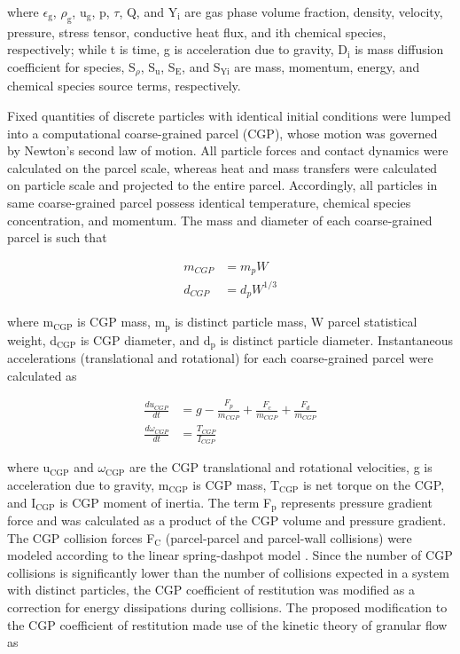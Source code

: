 \noindent where $\epsilon_\text{g}$, $\rho_\text{g}$, u$_\text{g}$, p, $\tau$, Q, and Y$_\text{i}$ are gas phase volume fraction, density, velocity, pressure, stress tensor, conductive heat flux, and ith chemical species, respectively; while t is time, g is acceleration due to gravity, D$_\text{i}$ is mass diffusion coefficient for species, S$_\rho$, S$_\text{u}$, S$_\text{E}$, and S$_\text{Yi}$ are mass, momentum, energy, and chemical species source terms, respectively.

Fixed quantities of discrete particles with identical initial conditions were lumped into a computational coarse-grained parcel (CGP), whose motion was governed by Newton’s second law of motion. All particle forces and contact dynamics were calculated on the parcel scale, whereas heat and mass transfers were calculated on particle scale and projected to the entire parcel. Accordingly, all particles in same coarse-grained parcel possess identical temperature, chemical species concentration, and momentum. The mass and diameter of each coarse-grained parcel is such that

\begin{align}
    m_{CGP} &= m_p W \\
    d_{CGP} &= d_p W^{1/3}
\end{align}

\noindent where m$_\text{CGP}$ is CGP mass, m$_\text{p}$ is distinct particle mass, W parcel statistical weight, d$_\text{CGP}$ is CGP diameter, and d$_\text{p}$ is distinct particle diameter. Instantaneous accelerations (translational and rotational) for each coarse-grained parcel were calculated as

\begin{align}
    \frac{d u_{CGP}}{dt} &= g - \frac{F_p}{m_{CGP}} + \frac{F_c}{m_{CGP}} + \frac{F_d}{m_{CGP}} \\
    \frac{d \omega_{CGP}}{dt} &= \frac{T_{CGP}}{I_{CGP}}
\end{align}

\noindent where u$_\text{CGP}$ and $\omega_\text{CGP}$ are the CGP translational and rotational velocities, g is acceleration due to gravity, m$_\text{CGP}$ is CGP mass, T$_\text{CGP}$ is net torque on the CGP, and I$_\text{CGP}$ is CGP moment of inertia. The term F$_\text{p}$ represents pressure gradient force and was calculated as a product of the CGP volume and pressure gradient. The CGP collision forces F$_\text{C}$ (parcel-parcel and parcel-wall collisions) were modeled according to the linear spring-dashpot model \cite{Navarro-2013}. Since the number of CGP collisions is significantly lower than the number of collisions expected in a system with distinct particles, the CGP coefficient of restitution was modified as a correction for energy dissipations during collisions. The proposed modification to the CGP coefficient of restitution made use of the kinetic theory of granular flow \cite{Lu-2014} as

